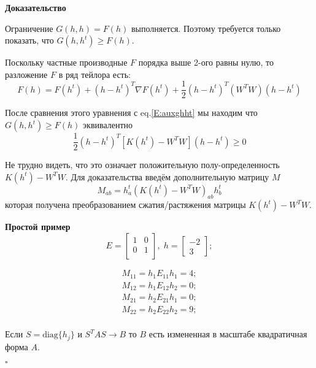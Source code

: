 \documentclass[oneside, final, 14pt]{extarticle}
\begin{document}
\textbf{Доказательство}

Ограничение $G(h,h) = F(h)$ выполняется. Поэтому требуется только
показать, что $G(h,h^t) \geqslant F(h)$.

Поскольку частные производные $F$ порядка выше 2-ого равны нулю,
то разложение $F$ в ряд тейлора есть:
\begin{equation}\label{E:f_taylor}
  F(h) = F(h^t) + (h - h^t)^T \nabla F(h^t)
    + \frac{1}{2} (h - h^t)^T (W^TW) (h - h^t)
\end{equation}

После сравнения этого уравнения с eq.\eqref{E:auxghht} мы находим
что $G(h,h^t) \geqslant F(h)$ эквивалентно
\[
  \frac{1}{2} (h - h^t)^T \left[K(h^t) - W^TW\right] (h - h^t) \geqslant 0
\]

Не трудно видеть, что это означает положительную полу-определенность
$K(h^t) - W^TW$.
Для доказательства введём дополнительную матрицу $M$
\begin{equation}
  M_{ab} = h_a^t (K(h^t) - W^T W)_{ab} h_b^t
\end{equation}
которая получена преобразованием сжатия/растяжения
матрицы $K(h^t) - W^TW$.

\textbf{Простой пример}
\[
  E =
  \begin{bmatrix}
    1 & 0 \\
    0 & 1 \\
  \end{bmatrix}, \;
  h = \begin{bmatrix} -2 \\ 3 \end{bmatrix};
\]

\begin{align*}
  M_{11} = h_1 E_{11} h_1 = 4; \\
  M_{12} = h_1 E_{12} h_2 = 0; \\
  M_{21} = h_2 E_{21} h_1 = 0; \\
  M_{22} = h_2 E_{22} h_2 = 9; \\
\end{align*}

Если $ S = \text{diag}\{h_j\}$ и $S^T A S \rightarrow B$
то $B$ есть измененная в масштабе квадратичная форма $A$.

$\square$
\end{document}
